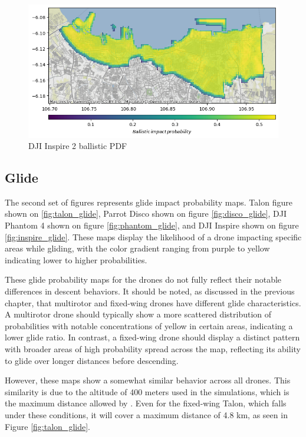 \documentclass[12pt]{report}
\begin{document}
        \begin{figure}[H]
            \centering
            \includegraphics[width=\textwidth]{Plot/inspire/ballistic_pdf.png}
            \caption{DJI Inspire 2 ballistic PDF}
            \label{fig:inspire_ballistic}
        \end{figure}

        \subsection{Glide}
        The second set of figures represents glide impact probability maps. Talon figure shown on \ref{fig:talon_glide},
        Parrot Disco shown on figure \ref{fig:disco_glide}, DJI Phantom 4 shown on figure \ref{fig:phantom_glide}, and
        DJI Inspire shown on figure \ref{fig:inspire_glide}. These maps display the likelihood of a drone impacting
        specific areas while gliding, with the color gradient ranging from purple to yellow indicating lower to higher
        probabilities.
            
        These glide probability maps for the drones do not fully reflect their notable differences in descent behaviors.
        It should be noted, as discussed in the previous chapter, that multirotor and fixed-wing drones have different
        glide characteristics. A multirotor drone should typically show a more scattered distribution of probabilities
        with notable concentrations of yellow in certain areas, indicating a lower glide ratio. In contrast, a
        fixed-wing drone should display a distinct pattern with broader areas of high probability spread across the map,
        reflecting its ability to glide over longer distances before descending.
            
        However, these maps show a somewhat similar behavior across all drones. This similarity is due to the altitude
        of 400 meters used in the simulations, which is the maximum distance allowed by \cite{arc_unmanned_2015}. Even
        for the fixed-wing Talon, which falls under these conditions, it will cover a maximum distance of 4.8 km, as
        seen in Figure \ref{fig:talon_glide}.
\end{document}
